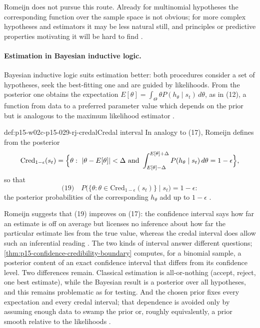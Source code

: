 Romeijn does not pursue this route. Already for multinomial hypotheses
the corresponding function over the sample space is not obvious; for
more complex hypotheses and estimators it may be less natural still,
and principles or predictive properties motivating it will be hard to
find \cite[p.~645]{Romeijn2011InductiveLogicStatistics}.

\paragraph{Estimation in Bayesian inductive logic.}
Bayesian inductive logic suits estimation better: both procedures
consider a set of hypotheses, seek the best-fitting one and are guided
by likelihoods. From the posterior one obtains the expectation
\(E[\theta]=\int_\Theta\theta P(h_\theta\mid s_t)\,d\theta\), as in (12),
a function from data to a preferred parameter value which depends on the
prior but is analogous to the maximum likelihood estimator
\cite[p.~645]{Romeijn2011InductiveLogicStatistics}.

\begin{hbdefinition}{def:p15-w02c-p15-029-rj-credal}{Credal interval}
In analogy to (17), Romeijn defines from the posterior
\[
 \mathrm{Cred}_{1-\epsilon}(s_t)=\Bigl\{\theta:\ |\theta-E[\theta]|<\Delta\ \text{and}\ \int_{E[\theta]-\Delta}^{E[\theta]+\Delta}P(h_\theta\mid s_t)\,d\theta=1-\epsilon\Bigr\},
\]
so that
\[
 \text{(19)}\quad P\bigl(\{\theta:\theta\in\mathrm{Cred}_{1-\epsilon}(s_t)\}\mid s_t\bigr)=1-\epsilon :
\]
the posterior probabilities of the corresponding \(h_\theta\) add up to
\(1-\epsilon\) \cite[pp.~645--646]{Romeijn2011InductiveLogicStatistics}.
\end{hbdefinition}

Romeijn suggests that (19) improves on (17): the confidence interval
says how far an estimate is off on average but licenses no inference
about how far the particular estimate lies from the true value, whereas
the credal interval does allow such an inferential reading
\cite[p.~646]{Romeijn2011InductiveLogicStatistics}. The two kinds of
interval answer different questions;
\cref{thm:p15-confidence-credibility-boundary} computes, for a binomial
sample, a posterior content of an exact confidence interval that differs
from its confidence level. Two differences remain. Classical estimation
is all-or-nothing (accept, reject, one best estimate), while the
Bayesian result is a posterior over all hypotheses, and this remains
problematic as for testing. And the chosen prior fixes every
expectation and every credal interval; that dependence is avoided only by assuming
enough data to swamp the prior or, roughly equivalently, a prior smooth
relative to the likelihoods \cite[p.~646]{Romeijn2011InductiveLogicStatistics}.

